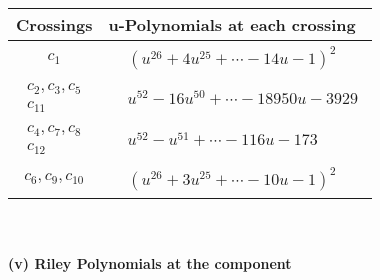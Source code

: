 \documentclass[1p]{elsarticle_modified}
\theoremstyle{definition}
\begin{document}
\begin{tabular}{m{50pt}|m{274pt}}
Crossings & \hspace{64pt}u-Polynomials at each crossing \\
\hline $$\begin{aligned}c_{1}\end{aligned}$$&$\begin{aligned}
&(u^{26}+4 u^{25}+\cdots-14 u-1)^{2}
\end{aligned}$\\
\hline $$\begin{aligned}c_{2},c_{3},c_{5}\\c_{11}\end{aligned}$$&$\begin{aligned}
&u^{52}-16 u^{50}+\cdots-18950 u-3929
\end{aligned}$\\
\hline $$\begin{aligned}c_{4},c_{7},c_{8}\\c_{12}\end{aligned}$$&$\begin{aligned}
&u^{52}- u^{51}+\cdots-116 u-173
\end{aligned}$\\
\hline $$\begin{aligned}c_{6},c_{9},c_{10}\end{aligned}$$&$\begin{aligned}
&(u^{26}+3 u^{25}+\cdots-10 u-1)^{2}
\end{aligned}$\\
\hline
\end{tabular}\\~\\
\newpage\renewcommand{\arraystretch}{1}
\flushleft \textbf{(v) Riley Polynomials at the component}\newline \\
\end{document}
